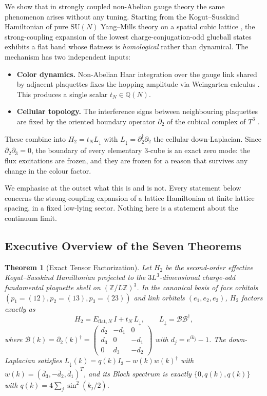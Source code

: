 \documentclass[11pt,a4paper]{article}
\newtheorem{theorem}{Theorem}[section]
\theoremstyle{definition}
\newcommand{\Q}{\mathbb{Q}}
\newcommand{\Z}{\mathbb{Z}}
\newcommand{\Ldn}{L_{\downarrow}}
\newcommand{\dg}{^{\dagger}}
\newcommand{\SU}{\mathrm{SU}}
\newcommand{\Bc}{\mathcal{B}}          %
\begin{document}
We show that in strongly coupled non-Abelian gauge theory the same phenomenon arises without any tuning. Starting from the Kogut--Susskind Hamiltonian of pure $\SU(N)$ Yang--Mills theory on a spatial cubic lattice \cite{KogutSusskind1975}, the strong-coupling expansion of the lowest charge-conjugation-odd glueball states exhibits a flat band whose flatness is \emph{homological} rather than dynamical. The mechanism has two independent inputs:
\begin{itemize}\itemsep2pt
  \item \textbf{Color dynamics.} Non-Abelian Haar integration over the gauge link shared by adjacent plaquettes fixes the hopping amplitude via Weingarten calculus \cite{Weingarten1978,CollinsSniady2006}. This produces a single scalar $t_N \in \Q(N)$.
  \item \textbf{Cellular topology.} The interference signs between neighbouring plaquettes are fixed by the oriented boundary operator $\partial_2$ of the cubical complex of $T^3$ \cite{Eckmann1944,Dimakis1994,Forman1998}.
\end{itemize}
These combine into $H_2 = t_N \Ldn$ with $\Ldn = \partial_2\dg\partial_2$ the cellular down-Laplacian. Since $\partial_2\partial_3 = 0$, the boundary of every elementary $3$-cube is an exact zero mode: the flux excitations are frozen, and they are frozen for a reason that survives any change in the colour factor.

We emphasise at the outset what this is and is not. Every statement below concerns the strong-coupling expansion of a lattice Hamiltonian at finite lattice spacing, in a fixed low-lying sector. Nothing here is a statement about the continuum limit.

\subsection{Executive Overview of the Seven Theorems}

\begin{theorem}[Exact Tensor Factorization]\label{thm:intro_factorization}
Let $H_2$ be the second-order effective Kogut--Susskind Hamiltonian projected to the $3L^3$-dimensional charge-odd fundamental plaquette shell on $(\Z/L\Z)^3$. In the canonical basis of face orbitals $(p_1=(12), p_2=(13), p_3=(23))$ and link orbitals $(e_1,e_2,e_3)$, $H_2$ factors exactly as
\begin{equation}\label{eq:intro_H2}
  H_2 = E_{\mathrm{flat},N}\,I + t_N \, \Ldn, \qquad \Ldn = \Bc\Bc\dg,
\end{equation}
where $\Bc(k) = \partial_2(k)\dg = \begin{pmatrix} d_2 & -d_1 & 0 \\ d_3 & 0 & -d_1 \\ 0 & d_3 & -d_2 \end{pmatrix}$ with $d_j = e^{ik_j}-1$. The down-Laplacian satisfies $\Ldn(k) = q(k) I_3 - w(k)w(k)\dg$ with $w(k) = (\bar d_3, -\bar d_2, \bar d_1)^T$, and its Bloch spectrum is exactly $\{0, q(k), q(k)\}$ with $q(k) = 4\sum_{j}\sin^2(k_j/2)$.
\end{theorem}
\end{document}
